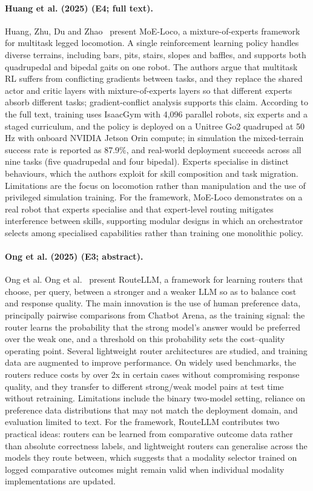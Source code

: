 \documentclass[10pt,a4paper]{article}
\begin{document}
\paragraph{Huang et al. (2025) (E4; full text).} Huang, Zhu, Du and Zhao~\cite{Huang2025} present MoE-Loco, a mixture-of-experts framework for multitask legged locomotion. A single reinforcement learning policy handles diverse terrains, including bars, pits, stairs, slopes and baffles, and supports both quadrupedal and bipedal gaits on one robot. The authors argue that multitask RL suffers from conflicting gradients between tasks, and they replace the shared actor and critic layers with mixture-of-experts layers so that different experts absorb different tasks; gradient-conflict analysis supports this claim. According to the full text, training uses IsaacGym with 4,096 parallel robots, six experts and a staged curriculum, and the policy is deployed on a Unitree Go2 quadruped at 50 Hz with onboard NVIDIA Jetson Orin compute; in simulation the mixed-terrain success rate is reported as 87.9\%, and real-world deployment succeeds across all nine tasks (five quadrupedal and four bipedal). Experts specialise in distinct behaviours, which the authors exploit for skill composition and task migration. Limitations are the focus on locomotion rather than manipulation and the use of privileged simulation training. For the framework, MoE-Loco demonstrates on a real robot that experts specialise and that expert-level routing mitigates interference between skills, supporting modular designs in which an orchestrator selects among specialised capabilities rather than training one monolithic policy.

\paragraph{Ong et al. (2025) (E3; abstract).} Ong et al. Ong et al.~\cite{Ong2025} present RouteLLM, a framework for learning routers that choose, per query, between a stronger and a weaker LLM so as to balance cost and response quality. The main innovation is the use of human preference data, principally pairwise comparisons from Chatbot Arena, as the training signal: the router learns the probability that the strong model's answer would be preferred over the weak one, and a threshold on this probability sets the cost--quality operating point. Several lightweight router architectures are studied, and training data are augmented to improve performance. On widely used benchmarks, the routers reduce costs by over 2x in certain cases without compromising response quality, and they transfer to different strong/weak model pairs at test time without retraining. Limitations include the binary two-model setting, reliance on preference data distributions that may not match the deployment domain, and evaluation limited to text. For the framework, RouteLLM contributes two practical ideas: routers can be learned from comparative outcome data rather than absolute correctness labels, and lightweight routers can generalise across the models they route between, which suggests that a modality selector trained on logged comparative outcomes might remain valid when individual modality implementations are updated.
\end{document}
